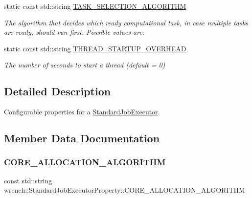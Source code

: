 \begin{DoxyCompactItemize}
static const std\+::string \hyperlink{classwrench_1_1_standard_job_executor_property_a6dec558a4ba61c4858e29c93cc33c6d6}{T\+A\+S\+K\+\_\+\+S\+E\+L\+E\+C\+T\+I\+O\+N\+\_\+\+A\+L\+G\+O\+R\+I\+T\+HM}
\begin{DoxyCompactList}\small\item\em The algorithm that decides which ready computational task, in case multiple tasks are ready, should run first. Possible values are\+: \end{DoxyCompactList}\item 
\mbox{\label{classwrench_1_1_standard_job_executor_property_a3150e71e6f2107b16fc2c483c127b26f}} 
static const std\+::string \hyperlink{classwrench_1_1_standard_job_executor_property_a3150e71e6f2107b16fc2c483c127b26f}{T\+H\+R\+E\+A\+D\+\_\+\+S\+T\+A\+R\+T\+U\+P\+\_\+\+O\+V\+E\+R\+H\+E\+AD}
\begin{DoxyCompactList}\small\item\em The number of seconds to start a thread (default = 0) \end{DoxyCompactList}\end{DoxyCompactItemize}


\subsection{Detailed Description}
Configurable properties for a \hyperlink{classwrench_1_1_standard_job_executor}{Standard\+Job\+Executor}. 

\subsection{Member Data Documentation}
\mbox{\label{classwrench_1_1_standard_job_executor_property_ae5ce6920c874824ce3bc02748a80204f}} 
\subsubsection{\texorpdfstring{C\+O\+R\+E\+\_\+\+A\+L\+L\+O\+C\+A\+T\+I\+O\+N\+\_\+\+A\+L\+G\+O\+R\+I\+T\+HM}{CORE\_ALLOCATION\_ALGORITHM}}
{\footnotesize\ttfamily const std\+::string wrench\+::\+Standard\+Job\+Executor\+Property\+::\+C\+O\+R\+E\+\_\+\+A\+L\+L\+O\+C\+A\+T\+I\+O\+N\+\_\+\+A\+L\+G\+O\+R\+I\+T\+HM\hspace{0.3cm}{\ttfamily [static]}}



